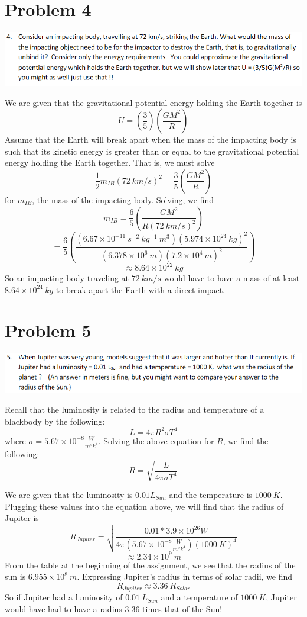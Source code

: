 \documentclass{article}
\begin{document}
\section{Problem 4}
\includegraphics[scale = 0.8]{probset4prob4.PNG}

We are given that the gravitational potential energy holding the Earth together is  
\[U = (\frac{3}{5})(\frac{GM^2}{R})\]
Assume that the Earth will break apart when the mass of the impacting body is such that its kinetic energy is greater than or equal to the gravitational potential energy holding the Earth together. That is, we must solve
\[\frac{1}{2}m_{IB}(72 \: km/s)^2 = \frac{3}{5}(\frac{GM^2}{R})\]
for $m_{IB}$, the mass of the impacting body. Solving, we find
\[m_{IB} = \frac{6}{5}(\frac{GM^2}{R(72 \: km/s)^2})\]
\[ = \frac{6}{5}(\frac{(6.67 \times 10^{-11} \: s^{-2} \: kg^{-1} \: m^3)(5.974 \times 10^{24} \: kg)^2}{(6.378 \times 10^{6} \: m)(7.2 \times 10^4 \: m)^2})\]
\[ \approx 8.64 \times 10^{22} \: kg\]
So an impacting body traveling at $72 \: km/s$ would have to have a mass of at least $8.64 \times 10^{24} \: kg$ to break apart the Earth with a direct impact.

\section{Problem 5}
\includegraphics[scale = 0.8]{probset4prob5.PNG}

Recall that the luminosity is related to the radius and temperature of a blackbody by the following:
\[L = 4\pi R^2 \sigma T^4\]
where $\sigma = 5.67 \times 10^{-8} \frac{W}{m^2 k^4}$. Solving the above equation for $R$, we find the following:
\[R = \sqrt{\frac{L}{4 \pi \sigma T^4}}\]

We are given that the luminosity is $0.01 L_{Sun}$ and the temperature is $1000 \:K$. Plugging these values into the equation above, we will find that the radius of Jupiter is
\[R_{Jupiter} = \sqrt{\frac{0.01*3.9 \times 10^{26}W}{4\pi (5.67 \times 10^{-8} \frac{W}{m^2 k^4})(1000 \:K)^4}}\]
\[\approx 2.34 \times 10^9 \:m\]
From the table at the beginning of the assignment, we see that the radius of the sun is $6.955 \times 10^{8} \:m$. Expressing Jupiter's radius in terms of solar radii, we find
\[R_{Jupiter} \approx 3.36 \:R_{Solar}\]
So if Jupiter had a luminosity of $0.01 \:L_{Sun}$ and a temperature of $1000 \:K$, Jupiter would have had to have a radius $3.36$ times that of the Sun! 
\end{document}
